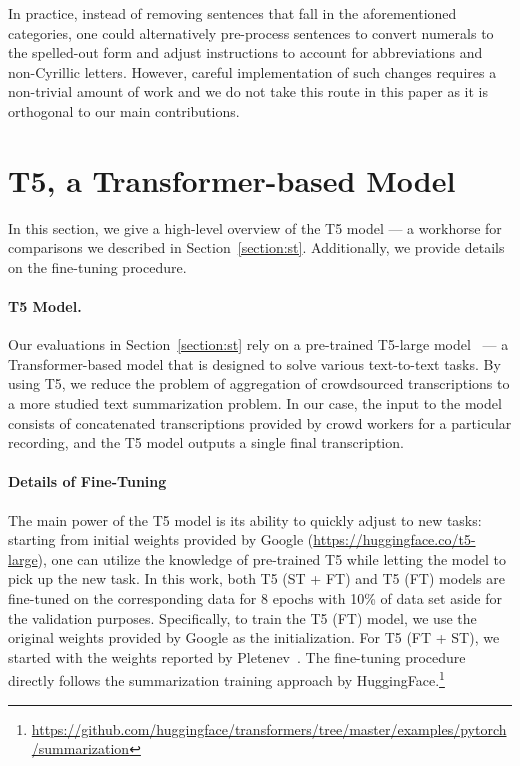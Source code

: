\documentclass{article}
\begin{document}
In practice, instead of removing sentences that fall in the aforementioned categories, one could alternatively pre-process sentences to convert numerals to the spelled-out form and adjust instructions to account for abbreviations and non-Cyrillic letters. However, careful implementation of such changes requires a non-trivial amount of work and we do not take this route in this paper as it is orthogonal to our main contributions.


\section{T5, a Transformer-based Model}
\label{section:t5}

In this section, we give a high-level overview of the T5 model --- a workhorse for comparisons we described in Section~\ref{section:st}. Additionally, we provide details on the fine-tuning procedure.

\paragraph{T5 Model.} Our evaluations in Section~\ref{section:st} rely on a pre-trained T5-large model~\citep{JMLR:v21:20-074} --- a Transformer-based model that is designed to solve various text-to-text tasks. By using T5, we reduce the problem of aggregation of crowdsourced transcriptions to a more studied text summarization problem. In our case, the input to the model consists of concatenated transcriptions provided by crowd workers for a particular recording, and the T5 model outputs a single final transcription. 

\paragraph{Details of Fine-Tuning} The main power of the T5 model is its ability to quickly adjust to new tasks: starting from initial weights provided by Google (\url{https://huggingface.co/t5-large}), one can utilize the knowledge of pre-trained T5 while letting the model to pick up the new task. In this work, both T5 (ST + FT) and T5 (FT) models are fine-tuned on the corresponding data for 8 epochs with 10\% of data set aside for the validation purposes. Specifically, to train the T5 (FT) model, we use the original weights provided by Google as the initialization. For T5 (FT + ST), we started with the weights reported by Pletenev~\citep{pletenev21noisy}. The fine-tuning procedure directly follows the summarization training approach by HuggingFace.\footnote{\url{https://github.com/huggingface/transformers/tree/master/examples/pytorch/summarization}} 
\end{document}
